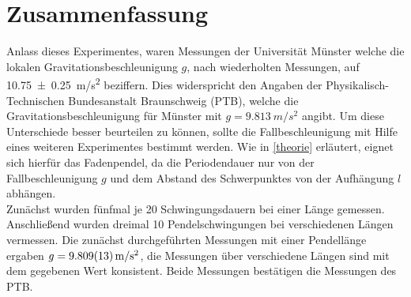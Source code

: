 \section{Zusammenfassung}
Anlass dieses Experimentes, waren Messungen der Universität Münster welche die lokalen Gravitationsbeschleunigung $g$, nach wiederholten Messungen, auf \SI{10,75+-0,25}{m/s^2} beziffern. Dies widerspricht den Angaben der Physikalisch-Technischen Bundesanstalt Braunschweig (PTB), welche die Gravitationsbeschleunigung für Münster mit $g=\SI{9,813}{m/s^2}$ angibt. Um diese Unterschiede besser beurteilen zu können, sollte die Fallbeschleunigung mit Hilfe eines weiteren Experimentes bestimmt werden. Wie in \cref{theorie} erläutert, eignet sich hierfür das Fadenpendel, da die Periodendauer nur von der Fallbeschleunigung $g$ und dem Abstand des Schwerpunktes von der Aufhängung $l$ abhängen.\\
Zunächst wurden fünfmal je 20 Schwingungsdauern bei einer Länge gemessen. Anschließend wurden dreimal 10 Pendelschwingungen bei verschiedenen Längen vermessen. Die zunächst durchgeführten Messungen mit einer Pendellänge ergaben $g=\SI{9,809+-0,013}{m/s^2}$, die Messungen über verschiedene Längen sind mit dem gegebenen Wert konsistent. Beide Messungen bestätigen die Messungen des PTB.